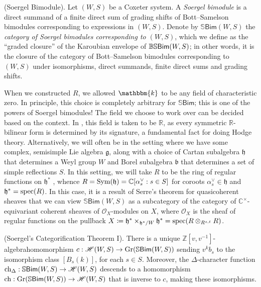 \noindent\begin{definition}\textup{(Soergel Bimodule).} Let $(W, S)$ be a Coxeter system. A {\em Soergel bimodule} is a direct summand of a finite direct sum of grading shifts of Bott--Samelson bimodules corresponding to expressions in $(W, S)$. Denote by $\mathbb{S}\textsf{Bim}(W, S)$ the {\em category of Soergel bimodules corresponding to $(W, S)$}, which we define as the ``graded closure'' of the Karoubian envelope of $\mathbb{BS}\textnormal{\textsf{Bim}}(W, S)$; in other words, it is the closure of the category of Bott--Samelson bimodules corresponding to $(W, S)$ under isomorphisms, direct summands, finite direct sums and grading shifts.\\
\end{definition}

\noindent\begin{remark} When we constructed $R$, we allowed $\mathbbm{k}$ to be any field of characteristic zero. In principle, this choice is completely arbitrary for $\mathbb{S}\textsf{Bim}$; this is one of the powers of Soergel bimodules! The field we choose to work over can be decided based on the context. In \cite{EMTW20}, this field is taken to be $\mathbb{R}$, as every symmetric $\mathbb{R}$-bilinear form is determined by its signature, a fundamental fact for doing Hodge theory. Alternatively, we will often be in the setting where we have some complex, semisimple Lie algebra $\mathfrak{g}$, along with a choice of Cartan subalgebra $\mathfrak{h}$ that determines a Weyl group $W$ and Borel subalgebra $\mathfrak{b}$ that determines a set of simple reflections $S$. In this setting, we will take $R$ to be the ring of regular functions on $\mathfrak{h}^*$%
, whence $R = \textup{Sym}(\mathfrak{h}) = \mathbb{C}[\alpha_s^\vee : s \in S]$ for coroots $\alpha_s^\vee \in \mathfrak{h}$ and $\mathfrak{h}^* = \textup{spec}(R)$. In this case, it is a result of Serre's theorem for quasicoherent sheaves that we can view $\mathbb{S}\textsf{Bim}(W, S)$ as a subcategory of the category of $\mathbb{C}^\times$-equivariant coherent sheaves of $\mathscr{O}_X$-modules on $X$, where $\mathscr{O}_X$ is the sheaf of regular functions on the pullback ${X \coloneqq \mathfrak{h}^* \times_{\mathfrak{h}^*/W} \mathfrak{h}^* = \textup{spec}(R \otimes_{R^{s,t}} R)}$.\\
\end{remark}

\noindent\begin{theorem}\textup{(Soergel's Categorification Theorem I).}\label{SoergelCategorification} There is a unique $\mathbb{Z}[v, v^{-1}]$-algebra\linebreak homomorphism $c : \mathscr{H}(W, S) \to \textup{Gr}(\mathbb{S}\textnormal{\textsf{Bim}}(W, S))$ sending $v^k b_s$ to the isomorphism class $[B_s(k)]$, for each $s \in S$. Moreover, the $\Delta$-character function $\textup{ch}_\Delta : \mathbb{S}\textnormal{\textsf{Bim}}(W, S) \to \mathscr{H}(W, S)$ descends to a homomorphism $\textup{ch} : \textup{Gr}(\mathbb{S}\textnormal{\textsf{Bim}}(W, S)) \to \mathscr{H}(W, S)$ that is inverse to $c$, making these isomorphisms.\\
\end{theorem}

